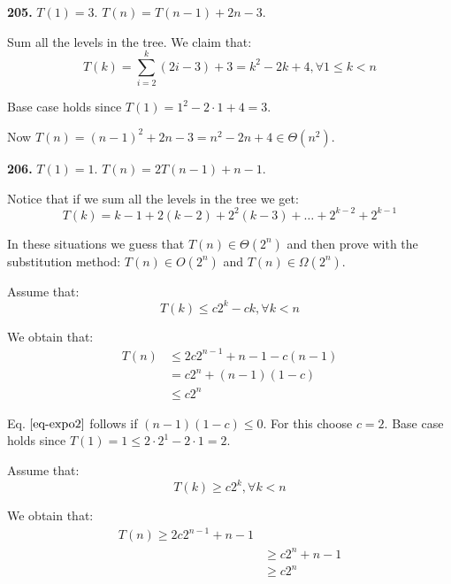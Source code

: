 \documentclass[11pt,a4paper]{article}
\renewcommand{\leq}{\leqslant}
\renewcommand{\geq}{\geqslant}
\begin{document}
\noindent\textbf{205.} $T(1) = 3$. $T(n) = T(n - 1) + 2n - 3$.

Sum all the levels in the tree. We claim that:
\begin{equation}
	T(k) = \sum_{i=2}^{k}(2i - 3) + 3 = k^2 - 2k + 4, \forall 1 \leq k < n
\end{equation}

Base case holds since $T(1) = 1^2 - 2 \cdot 1 + 4 = 3$.

Now $T(n) = (n-1)^2 + 2n - 3 = n^2 - 2n + 4 \in \Theta(n^2)$.

\noindent\textbf{206.} $T(1) = 1$. $T(n) = 2T(n - 1) + n - 1$.

Notice that if we sum all the levels in the tree we get:
\begin{equation}
	T(k)= k-1 + 2(k-2) + 2^2(k-3) + \dots + 2^{k-2} + 2^{k-1}
\end{equation}

In these situations we guess that $T(n) \in \Theta(2^n)$ and then prove with the substitution method: $T(n) \in O(2^n)$ and $T(n) \in \Omega(2^n)$.

Assume that:
\begin{equation}
\label{eq-expo}
T(k) \leq c2^k - ck, \forall k < n
\end{equation}

We obtain that:
\begin{equation}
\label{eq-expo2}
\begin{split}
T(n) & \leq 2c2^{n-1}+n-1 - c(n-1) \\
	&= c2^{n} + (n-1)(1 - c) \\
	& \leq c2^{n}
\end{split}
\end{equation}

Eq. $\ref{eq-expo2}$ follows if $(n-1)(1-c) \leq 0$. For this choose $c=2$. Base case holds since $T(1) = 1 \leq 2 \cdot 2^{1} - 2\cdot 1=2$.

Assume that:
\begin{equation}
\label{eq-expo3}
T(k) \geq c2^k, \forall k < n
\end{equation}

We obtain that:
\begin{equation}
\begin{split}
	T(n) \geq 2c2^{n-1}+n-1 \\
	 & \geq c2^{n} + n-1 \\
	 & \geq c2^{n}
\end{split}
\end{equation}
\end{document}
